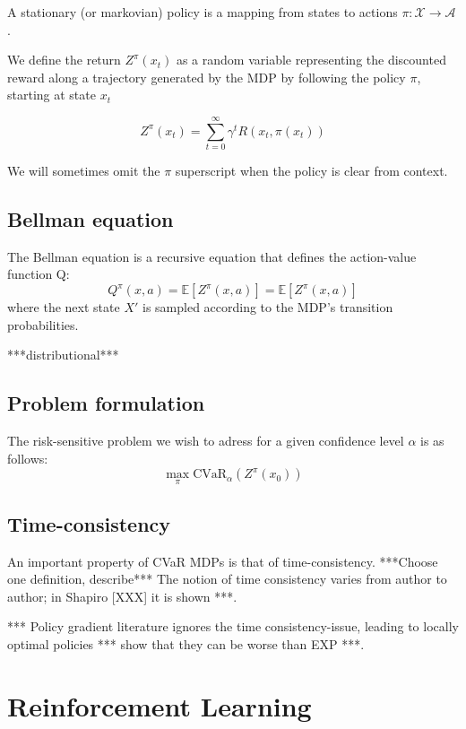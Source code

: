 A stationary (or markovian) policy is a mapping from states to actions $\pi:\mathcal{X} \to \mathcal{A}$.

We define the return $Z^\pi(x_t)$ as a random variable representing the discounted reward along a trajectory generated by the MDP by following the policy $\pi$, starting at state $x_t$

\begin{equation}
Z^\pi(x_{t})=\sum_{t=0}^\infty \gamma^tR(x_t,\pi(x_t))
\end{equation}

We will sometimes omit the $\pi$ superscript when the policy is clear from context.

\subsection{Bellman equation}
The Bellman equation is a recursive equation that defines the action-value function Q:
\begin{equation}
Q^\pi(x, a) = \mathbb{E}\left[ Z^\pi(x, a) \right] = \mathbb{E}\left[ Z^\pi(x, a) \right]
\end{equation}
where the next state $X'$ is sampled according to the MDP's transition probabilities.

***distributional***

\subsection{Problem formulation}
The risk-sensitive problem we wish to adress for a given confidence level $\alpha$ is as follows:
\begin{equation}
\max_\pi \text{CVaR}_\alpha(Z^\pi(x_0))
\end{equation}

\subsection{Time-consistency}
An important property of CVaR MDPs is that of time-consistency. ***Choose one definition, describe*** The notion of time consistency varies from author to author; in Shapiro [XXX] it is shown ***.

*** Policy gradient literature ignores the time consistency-issue, leading to locally optimal policies *** show that they can be worse than EXP ***.


\section{Reinforcement Learning}

